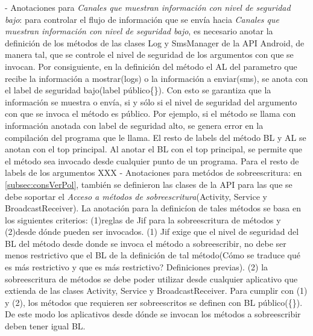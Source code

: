 - Anotaciones para \textit{Canales que muestran información con nivel de
seguridad bajo}: para controlar el flujo de información que se envía hacia
\textit{Canales que muestran información con nivel de seguridad bajo}, es
necesario anotar la definición de los métodos de las clases Log y SmsManager de
la API Android, de manera tal, que se controle el nivel de seguridad de los
argumentos con que se invocan. Por consiguiente, en la definición del método el
AL del parametro que recibe la información a mostrar(logs) o la información a
enviar(sms), se anota con el label de seguridad bajo(label público\{\}). Con
esto se garantiza que la información se muestra o envía, si y sólo si el nivel
de seguridad del argumento con que se invoca el método es público. Por ejemplo,
si el método se llama con información anotada con label de seguridad alto, se
genera error en la compilación del programa que le llama.\newline 
El resto de labels del método BL y AL se anotan con el top principal. Al anotar
el BL con el top principal, se permite que el método sea invocado desde
cualquier punto de un programa. 
Para el resto de labels de los argumentos XXX\newline
- Anotaciones para metódos de sobreescritura: en \ref{subsec:consVerPol},
también se definieron las clases de la API para las que se debe soportar el
\textit{Acceso a métodos de sobreescritura}(Activity, Service y
BroadcastReceiver). La anotación para la definicíon de tales métodos se basa en
los siguientes criterios: (1)reglas de Jif para la sobreescritura de métodos y
(2)desde dónde pueden ser invocados. (1) Jif exige que el nivel de seguridad del
BL del método desde donde se invoca el método a sobreescribir, no debe ser menos
restrictivo que el BL de la definición de tal método(Cómo se traduce qué es más
restrictivo y que es más restrictivo? Definiciones previas).
(2) la sobreescritura de métodos se debe poder utilizar desde cualquier aplicativo que
extienda de las clases Activity, Service y BroadcastReceiver.\newline
Para cumplir con (1) y (2), los métodos que requieren ser sobreescritos se
definen con BL público(\{\}). De este modo los aplicativos desde dónde se
invocan los métodos a sobreescribir deben tener igual BL.

